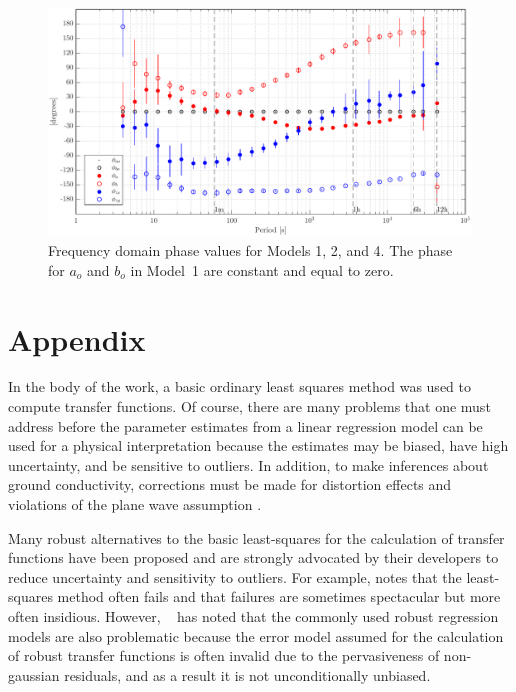 \documentclass[draft,linenumbers]{agujournal2018}
\begin{document}
\begin{figure}[h]
\centering
\includegraphics[width=\textwidth]{figures/plot_model_summary_Phi-options-1.pdf}
\caption{Frequency domain phase values for Models 1, 2, and 4. The phase for $a_o$ and $b_o$ in Model~1 are constant and equal to zero.}
\label{Phi}
\end{figure}

\clearpage

\appendix
\section{Appendix}


In the body of the work, a basic ordinary least squares method was used to compute transfer functions. Of course, there are many problems that one must address before the parameter estimates from a linear regression model can be used for a physical interpretation because the estimates may be biased, have high uncertainty, and be sensitive to outliers. In addition, to make inferences about ground conductivity, corrections must be made for distortion effects and violations of the plane wave assumption \citep{Simpson2005}.

Many robust alternatives to the basic least-squares for the calculation of transfer functions have been proposed and are strongly advocated by their developers to reduce uncertainty and sensitivity to outliers. For example, \cite{Egbert2011} notes that the least-squares method often fails and \cite{Chave1987} that failures are sometimes spectacular but more often insidious. However, ~\cite{Chave2017} has noted that the commonly used robust regression models are also problematic because the error model assumed for the calculation of robust transfer functions is often invalid due to the pervasiveness of non-gaussian residuals, and as a result it is not unconditionally unbiased.
\end{document}

